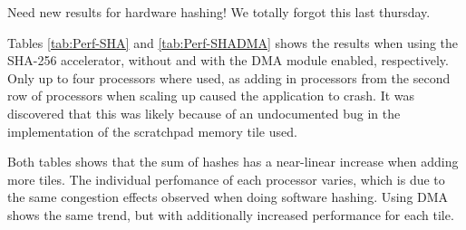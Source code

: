 Need new results for hardware hashing! We totally forgot this last thursday.

Tables \ref{tab:Perf-SHA} and \ref{tab:Perf-SHADMA} shows the results when using the SHA-256 accelerator, without and with the DMA module enabled, respectively.
Only up to four processors where used, as adding in processors from the second row of processors when scaling up caused the application to crash.
It was discovered that this was likely because of an undocumented bug in the implementation of the scratchpad memory tile used.

Both tables shows that the sum of hashes has a near-linear increase when adding more tiles.
The individual perfomance of each processor varies, which is due to the same congestion effects observed when doing software hashing.
Using DMA shows the same trend, but with additionally increased performance for each tile.

